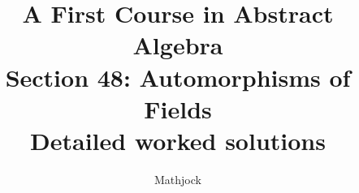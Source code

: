 
\title{\textbf{A First Course in Abstract Algebra}\\[0.3em]Section 48: Automorphisms of Fields\\[0.3em]\large Detailed worked solutions}
\author{Mathjock}
\date{}

\maketitle
\bookinfo
\tableofcontents
\clearpage
\renewcommand{\thesection}{48}
\renewcommand{\theHsection}{fraleigh.48}


